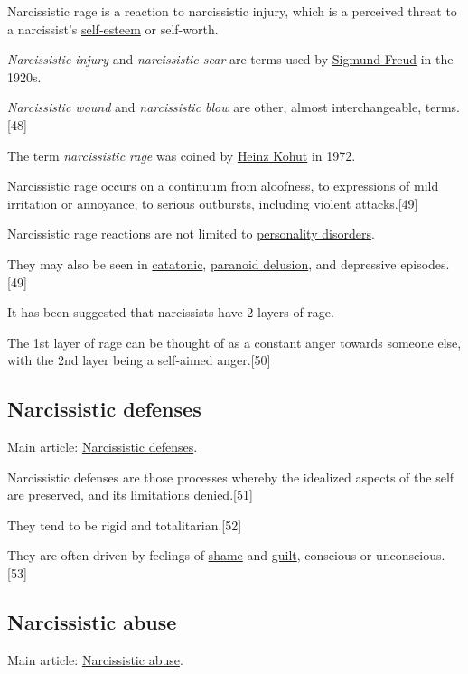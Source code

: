 \documentclass[oneside]{book}
\numberwithin{equation}{section}
\begin{document}
Narcissistic rage is a reaction to narcissistic injury, which is a perceived threat to a narcissist's \href{https://en.wikipedia.org/wiki/Self-esteem}{self-esteem} or self-worth.

\textit{Narcissistic injury} and \textit{narcissistic scar} are terms used by \href{https://en.wikipedia.org/wiki/Sigmund_Freud}{Sigmund Freud} in the 1920s.

\textit{Narcissistic wound} and \textit{narcissistic blow} are other, almost interchangeable, terms.[48]

%
The term \textit{narcissistic rage} was coined by \href{https://en.wikipedia.org/wiki/Heinz_Kohut}{Heinz Kohut} in 1972.

Narcissistic rage occurs on a continuum from aloofness, to expressions of mild irritation or annoyance, to serious outbursts, including violent attacks.[49]

%
Narcissistic rage reactions are not limited to \href{https://en.wikipedia.org/wiki/Personality_disorders}{personality disorders}.

They may also be seen in \href{https://en.wikipedia.org/wiki/Catatonic}{catatonic}, \href{https://en.wikipedia.org/wiki/Paranoid_delusion}{paranoid delusion}, and depressive episodes.[49]

It has been suggested that narcissists have 2 layers of rage.

The 1st layer of rage can be thought of as a constant anger towards someone else, with the 2nd layer being a self-aimed anger.[50]

\subsection{Narcissistic defenses}
Main article: \href{https://en.wikipedia.org/wiki/Narcissistic_defenses}{Narcissistic defenses}.

%
Narcissistic defenses are those processes whereby the idealized aspects of the self are preserved, and its limitations denied.[51]

They tend to be rigid and totalitarian.[52]

They are often driven by feelings of \href{https://en.wikipedia.org/wiki/Shame}{shame} and \href{https://en.wikipedia.org/wiki/Guilt_(emotion)}{guilt}, conscious or unconscious.[53]

\subsection{Narcissistic abuse}
Main article: \href{https://en.wikipedia.org/wiki/Narcissistic_abuse}{Narcissistic abuse}.
\end{document}
